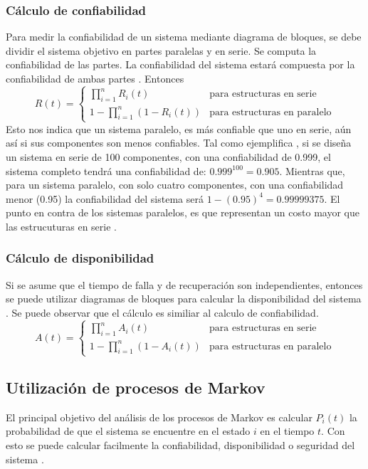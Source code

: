 \subsubsection{Cálculo de confiabilidad}
Para medir la confiabilidad de un sistema mediante diagrama de bloques, se debe dividir el sistema objetivo en  partes paralelas y en serie. Se computa la confiabilidad
de las partes. La confiabilidad del sistema estará compuesta por la confiabilidad de ambas partes \citep{FTDesign}. Entonces
$$R(t) = \left \{
\begin{matrix}
  \prod_{i=1}^{n} R_{i}(t) & \text{para estructuras en serie}\\
  1 - \prod_{i=1}^{n}(1-R_{i}(t)) & \text{para estructuras en paralelo}
\end{matrix} $$
Esto nos indica que un sistema paralelo, es más confiable que uno en serie, aún así si sus componentes son menos confiables. Tal como ejemplifica \cite{FTDesign}, si se diseña un sistema en serie de 100 componentes, con una confiabilidad de 0.999, el sistema completo tendrá una confiabilidad de:
$0.999^{100} = 0.905$. Mientras que, para un sistema paralelo, con solo cuatro componentes, con una confiabilidad menor (0.95) la confiabilidad del sistema
será $1-(0.95)^4 = 0.99999375$. El punto en contra de los sistemas paralelos, es que representan un costo mayor que las estrucuturas en serie \citep{FTDesign}.

\subsubsection{Cálculo de disponibilidad}
Si se asume que el tiempo de falla y de recuperación son independientes, entonces se puede utilizar diagramas de bloques para calcular la disponibilidad
del sistema  \citep{FTDesign}.  Se puede observar que el cálculo es similiar al calculo de confiabilidad.
 $$A(t) = \left \{
 \begin{matrix}
   \prod_{i=1}^{n} A_{i}(t) & \text{para estructuras en serie}\\
   1 - \prod_{i=1}^{n}(1-A_{i}(t)) & \text{para estructuras en paralelo}
 \end{matrix} $$

\subsection{Utilización de procesos de Markov}
El principal objetivo del análisis de los procesos de Markov es calcular $P_i(t)$ la probabilidad de que el sistema se encuentre en el estado $i$
en el tiempo $t$. Con esto se puede calcular facilmente la confiabilidad, disponibilidad o seguridad del sistema \citep{FTDesign}.

